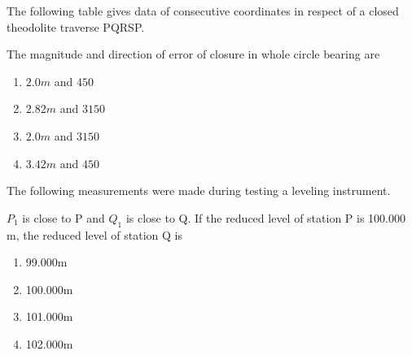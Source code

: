         \item{
        	
        	The following table gives data of consecutive coordinates in respect of a closed theodolite traverse PQRSP.
        	
        	
        	
        	The magnitude and direction of error of closure in whole circle bearing are
        	
        	\hfill
        	
        	\begin{multicols}{4}
        		\begin{enumerate}
        			\item $2.0m$ and $450$
        			\item $2.82m$ and $3150$
        			\item $2.0m$ and $3150$
        			\item $3.42m$ and $450$
        		\end{enumerate}
        	\end{multicols}
        	
        }
            \item{
        	
        	The following measurements were made during testing a leveling instrument.
        	
        	
        	
        	\(P_1\) is close to P and \(Q_1\) is close to Q. If the reduced level of station P is 100.000 m, the reduced level of station Q is
        	
        	\hfill
        	
        	\begin{multicols}{4}
        		\begin{enumerate}
        			\item 99.000m
        			\item 100.000m
        			\item 101.000m
        			\item 102.000m
        		\end{enumerate}
        	\end{multicols}
        	
        }    
